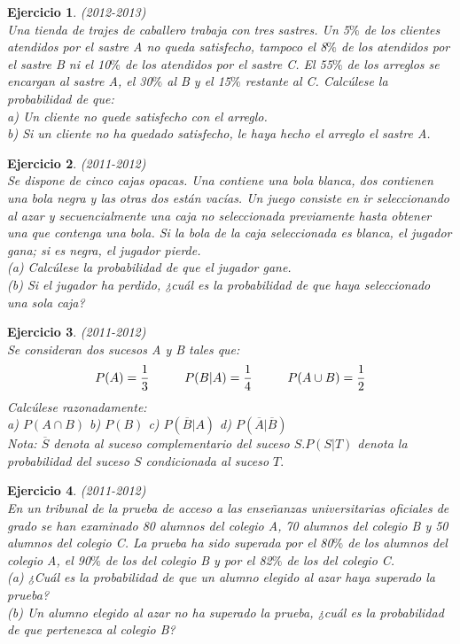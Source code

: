 \documentclass[12pt, a4paper]{amsart}
\newtheorem{ejer}{Ejercicio}
\begin{document}
\begin{ejer}\em (2012-2013)\\
Una tienda de trajes de caballero trabaja con tres sastres. Un 5$\%$ de los clientes atendidos por el sastre A no
queda satisfecho, tampoco el 8$\%$ de los atendidos por el sastre B ni el 10$\%$ de los atendidos por el sastre C.
El 55$\%$ de los arreglos se encargan al sastre A, el 30$\%$ al B y el 15$\%$ restante al C. Calcúlese la probabilidad
de que:\\
a) Un cliente no quede satisfecho con el arreglo.\\
b) Si un cliente no ha quedado satisfecho, le haya hecho el arreglo el sastre A.
\end{ejer}

\begin{ejer}\em (2011-2012)\\
Se dispone de cinco cajas opacas. Una contiene una bola blanca, dos contienen una bola negra y
las otras dos están vacías. Un juego consiste en ir seleccionando al azar y secuencialmente una
caja no seleccionada previamente hasta obtener una que contenga una bola. Si la bola de la caja
seleccionada es blanca, el jugador gana; si es negra, el jugador pierde.\\
(a) Calcúlese la probabilidad de que el jugador gane.\\
(b) Si el jugador ha perdido, ¿cuál es la probabilidad de que haya seleccionado una sola caja?
\end{ejer}

\begin{ejer}\em (2011-2012)\\
Se consideran dos sucesos A y B tales que:
\[P(A)=\frac{1}{3}\hspace*{1cm} P(B|A)=\frac{1}{4}\hspace*{1cm} P(A\cup B)=\frac{1}{2}\]
Calcúlese razonadamente:\\
a) $P(A\cap B)$\hspace*{1cm} 
b) $P(B)$\hspace*{1cm} 
c) $P(\overline{B}|A)$\hspace*{1cm} 
d) $P(\overline{A}|\overline{B})$\\
\textit{Nota: $\overline{S}$ denota al suceso complementario del suceso $S. P(S|T)$ denota la probabilidad del suceso $S$ condicionada al suceso $T.$}
\end{ejer}

\begin{ejer}\em (2011-2012)\\
En un tribunal de la prueba de acceso a las enseñanzas universitarias oficiales de grado se han
examinado 80 alumnos del colegio A, 70 alumnos del colegio B y 50 alumnos del colegio C. La
prueba ha sido superada por el 80$\%$ de los alumnos del colegio A, el 90$\%$ de los del colegio B y
por el 82$\%$ de los del colegio C.\\
(a) ¿Cuál es la probabilidad de que un alumno elegido al azar haya superado la prueba?\\
(b) Un alumno elegido al azar no ha superado la prueba, ¿cuál es la probabilidad de que
pertenezca al colegio B?
\end{ejer}
\end{document}

